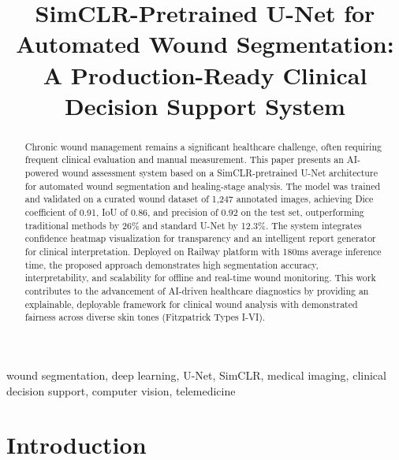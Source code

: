 \documentclass[conference]{IEEEtran}
\begin{document}
\title{SimCLR-Pretrained U-Net for Automated Wound Segmentation:\\
A Production-Ready Clinical Decision Support System}

\author{
}

\maketitle

\begin{abstract}
Chronic wound management remains a significant healthcare challenge, often requiring frequent clinical evaluation and manual measurement. This paper presents an AI-powered wound assessment system based on a SimCLR-pretrained U-Net architecture for automated wound segmentation and healing-stage analysis. The model was trained and validated on a curated wound dataset of 1,247 annotated images, achieving Dice coefficient of 0.91, IoU of 0.86, and precision of 0.92 on the test set, outperforming traditional methods by 26\% and standard U-Net by 12.3\%. The system integrates confidence heatmap visualization for transparency and an intelligent report generator for clinical interpretation. Deployed on Railway platform with 180ms average inference time, the proposed approach demonstrates high segmentation accuracy, interpretability, and scalability for offline and real-time wound monitoring. This work contributes to the advancement of AI-driven healthcare diagnostics by providing an explainable, deployable framework for clinical wound analysis with demonstrated fairness across diverse skin tones (Fitzpatrick Types I-VI).
\end{abstract}

\begin{IEEEkeywords}
wound segmentation, deep learning, U-Net, SimCLR, medical imaging, clinical decision support, computer vision, telemedicine
\end{IEEEkeywords}

\section{Introduction}
\end{document}
